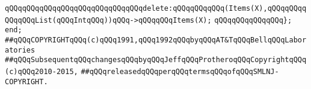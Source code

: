 \verb|qQQqqQQqqQQqqQQqqQQqqQQqqQQqqQQqdelete:qQQqqQQqqQQq(Items(X),qQQqqQQqqQQqqQQqList(qQQqIntqQQq))qQQq->qQQqqQQqItems(X);|\newline
\newline
\verb|qQQqqQQqqQQqqQQq};|\newline
\newline
\verb|end;|\newline
\newline
\verb|##qQQqCOPYRIGHTqQQq(c)qQQq1991,qQQq1992qQQqbyqQQqAT&TqQQqBellqQQqLaboratories|\newline
\verb|##qQQqSubsequentqQQqchangesqQQqbyqQQqJeffqQQqProtheroqQQqCopyrightqQQq(c)qQQq2010-2015,|\newline
\verb|##qQQqreleasedqQQqperqQQqtermsqQQqofqQQqSMLNJ-COPYRIGHT.|\newline

